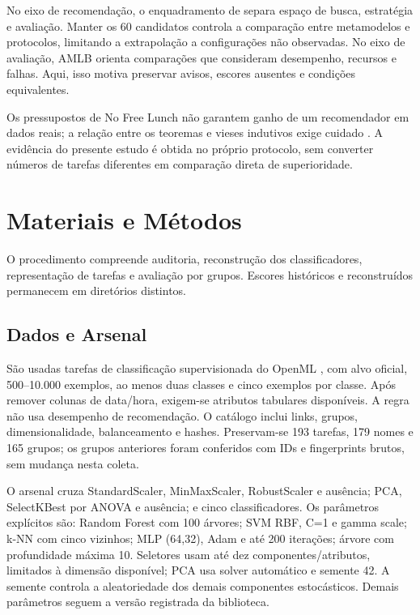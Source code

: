 \documentclass[kdmile,a4paper]{kdmile} %
\begin{document}
No eixo de recomendação, o enquadramento de  separa espaço de busca, estratégia e avaliação. Manter os 60 candidatos controla a comparação entre metamodelos e protocolos, limitando a extrapolação a configurações não observadas. No eixo de avaliação, AMLB \cite{Gijsbers2024} orienta comparações que consideram desempenho, recursos e falhas. Aqui, isso motiva preservar avisos, escores ausentes e condições equivalentes.

Os pressupostos de No Free Lunch não garantem ganho de um recomendador em dados reais; a relação entre os teoremas e vieses indutivos exige cuidado \cite{Goldblum2024}. A evidência do presente estudo é obtida no próprio protocolo, sem converter números de tarefas diferentes em comparação direta de superioridade.

\section{Materiais e Métodos}

O procedimento compreende auditoria, reconstrução dos classificadores, representação de tarefas e avaliação por grupos. Escores históricos e reconstruídos permanecem em diretórios distintos.

\subsection{Dados e Arsenal}

São usadas tarefas de classificação supervisionada do OpenML \cite{Vanschoren2014}, com alvo oficial, 500--10.000 exemplos, ao menos duas classes e cinco exemplos por classe. Após remover colunas de data/hora, exigem-se atributos tabulares disponíveis. A regra não usa desempenho de recomendação. O catálogo inclui links, grupos, dimensionalidade, balanceamento e hashes. Preservam-se 193 tarefas, 179 nomes e 165 grupos; os grupos anteriores foram conferidos com IDs e fingerprints brutos, sem mudança nesta coleta.

O arsenal cruza StandardScaler, MinMaxScaler, RobustScaler e ausência; PCA, SelectKBest por ANOVA e ausência; e cinco classificadores. Os parâmetros explícitos são: Random Forest com 100 árvores; SVM RBF, C=1 e gamma scale; k-NN com cinco vizinhos; MLP (64,32), Adam e até 200 iterações; árvore com profundidade máxima 10. Seletores usam até dez componentes/atributos, limitados à dimensão disponível; PCA usa solver automático e semente 42. A semente controla a aleatoriedade dos demais componentes estocásticos. Demais parâmetros seguem a versão registrada da biblioteca.
\end{document}
